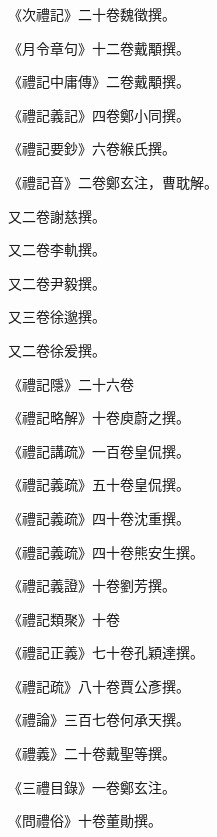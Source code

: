 \begin{pinyinscope}
 《次禮記》二十卷魏徵撰。



 《月令章句》十二卷戴顒撰。



 《禮記中庸傳》二卷戴顒撰。



 《禮記義記》四卷鄭小同撰。



 《禮記要鈔》六卷緱氏撰。



 《禮記音》二卷鄭玄注，曹耽解。



 又二卷謝慈撰。



 又二卷李軌撰。



 又二卷尹毅撰。



 又三卷徐邈撰。



 又二卷徐爰撰。



 《禮記隱》二十六卷



 《禮記略解》十卷庾蔚之撰。



 《禮記講疏》一百卷皇侃撰。



 《禮記義疏》五十卷皇侃撰。



 《禮記義疏》四十卷沈重撰。



 《禮記義疏》四十卷熊安生撰。



 《禮記義證》十卷劉芳撰。



 《禮記類聚》十卷



 《禮記正義》七十卷孔穎達撰。



 《禮記疏》八十卷賈公彥撰。



 《禮論》三百七卷何承天撰。



 《禮義》二十卷戴聖等撰。



 《三禮目錄》一卷鄭玄注。



 《問禮俗》十卷董勛撰。




\end{pinyinscope}
